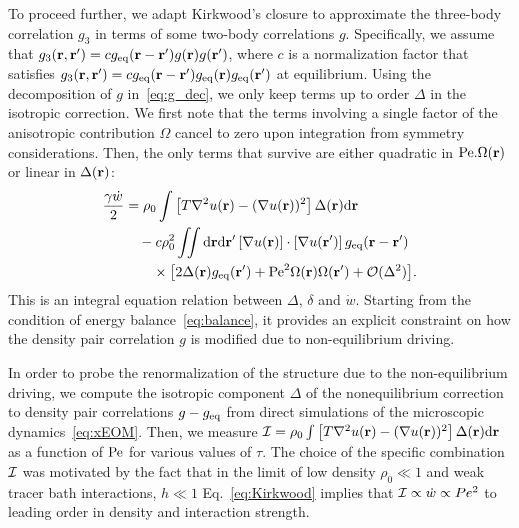 \documentclass[pre, superscriptaddress, twocolumn,pre]{revtex4-1}
\newcommand{\dd}{\text{d}}
\begin{document}
To proceed further, we adapt Kirkwood's closure to approximate the three-body correlation $g_3$ in terms of some two-body correlations $g$. Specifically, we assume that $g_3({\bf r},{\bf r}') = c g_{\rm eq}({\bf r} - {\bf r}') g({\bf r}) g({\bf r}')$, where $c$ is a normalization factor that satisfies $g_3({\bf r} , {\bf r}') = c g_{\rm eq}({\bf r} - {\bf r}')g_{\rm eq}({\bf r})g_{\rm eq}({\bf r}')$ at equilibrium. Using the decomposition of $g$ in~\eqref{eq:g_dec}, we only keep terms up to order $\Delta $ in the isotropic correction. We first note that the terms involving a single factor of the anisotropic contribution $\Omega$ cancel to zero upon integration from symmetry considerations. Then, the only terms that survive are either quadratic in ${\rm Pe}.\Omega({\bf r})$ or linear in $\Delta({\bf r})$:
\begin{equation}\label{eq:Kirkwood}
	\begin{aligned}
		\frac{\gamma\dot w}{2} &= \rho_0\int \left[T\nabla^2 u({\bf r}) - (\nabla u({\bf r}))^2 \right] \Delta({\bf r}) \dd{\bf r} 
		\\
		&\quad - c \rho_0^2 \iint\dd{\bf r}\dd{\bf r}' \left[\nabla u({\bf r})\right] \cdot \left[\nabla u({\bf r}')\right] g_{\rm eq}({\bf r}-{\bf r}')
		\\
		&\qquad\times \big[ 2 \Delta({\bf r}) g_{\rm eq}({\bf r}') + {\rm Pe}^2 \Omega({\bf r}) \Omega({\bf r}') + {\cal O}(\Delta^2) \big] .
	\end{aligned}
\end{equation}
This is an integral equation relation between $\Delta$, $\delta$ and $\dot w$. Starting from the condition of energy balance~\eqref{eq:balance}, it provides an explicit constraint on how the density pair correlation $g$ is modified due to non-equilibrium driving. 


In order to probe the renormalization of the structure due to the non-equilibrium driving, we compute the isotropic component $\Delta$ of the nonequilibrium correction to density pair correlations $g-g_{\rm eq}$ from direct simulations of the microscopic dynamics~\eqref{eq:xEOM}. Then, we measure ${\cal I} = \rho_0 \int \left[ T\nabla^2 u({\bf r}) - (\nabla u({\bf r}))^2\right] \Delta({\bf r}) \dd{\bf r}$ as a function of $\rm Pe$ for various values of $\tau$. The choice of the specific combination ${\cal I}$ was motivated by the fact that in the limit of low density $\rho_0 \ll 1$ and weak tracer bath interactions, $h\ll 1$ Eq.~\ref{eq:Kirkwood} implies that ${\cal I}\propto \dot{w}\propto Pe^2$ to leading order in density and interaction strength.   
\end{document}
